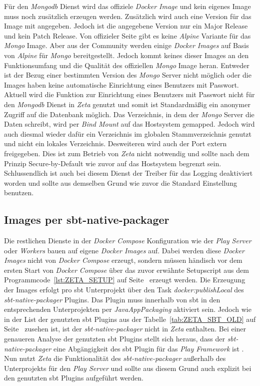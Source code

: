 Für den \textit{Mongodb} Dienst wird das offiziele \textit{Docker Image} und kein eigenes Image muss noch zusätzlich erzeugen werden. Zusätzlich wird auch eine Version für das Image mit angegeben. Jedoch ist die angegebene Version nur ein Major Release und kein Patch Release. Von offizieler Seite gibt es keine \textit{Alpine} Variante für das \textit{Mongo} Image. Aber aus der Community werden einige \textit{Docker Images} auf Basis von \textit{Alpine} für \textit{Mongo} bereitgestellt. Jedoch kommt keines dieser Images an den Funktionsumfang und die Qualität des offiziellen \textit{Mongo} Image heran. Entweder ist der Bezug einer bestimmten Version des \textit{Mongo} Server nicht möglich oder die Images haben keine automatische Einrichtung eines Benutzers mit Passwort. Aktuell wird die Funktion zur Einrichtung eines Benutzers mit Passwort nicht für den \textit{Mongodb} Dienst in \textit{Zeta} genutzt und somit ist Standardmäßig ein anonymer Zugriff auf die Datenbank möglich.  Das Verzeichnis, in dem der \textit{Mongo} Server die Daten schreibt, wird per \textit{Bind Mount} auf das Hostsystem gemapped. Jedoch wird auch diesmal wieder dafür ein Verzeichnis im globalen Stammverzeichnis genutzt und nicht ein lokales Verzeichnis. Desweiteren wird auch der Port extern freigegeben. Dies ist zum Betrieb von \textit{Zeta} nicht notwendig und sollte nach dem Prinzip Secure-by-Default wie zuvor auf das Hostsystem begrenzt sein. Schlussendlich ist auch bei diesem Dienst der Treiber für das Logging deaktiviert worden und sollte aus demselben Grund wie zuvor die Standard Einstellung benutzen.

\subsection{Images per sbt-native-packager}

Die restlichen Dienste in der \textit{Docker Compose} Konfiguration wie der \textit{Play Server} oder \textit{Workers} bauen auf eigene \textit{Docker Images} auf. Dabei werden diese \textit{Docker Images} nicht von \textit{Docker Compose} erzeugt, sondern müssen händisch vor dem ersten Start von \textit{Docker Compose} über das zuvor erwähnte Setupscript aus dem Programmcode~\ref{lst:ZETA_SETUP} auf Seite~\pageref{lst:ZETA_SETUP} erzeugt werden. Die Erzeugung der Images erfolgt pro \ac{sbt} Unterprojekt über den Task \textit{docker:publishLocal} des \textit{sbt-native-packager} Plugins. Das Plugin muss innerhalb von \ac{sbt} in den entsprechenden Unterprojekten per \textit{JavaAppPackaging} aktiviert sein. Jedoch wie in der List der genutzten \ac{sbt} Plugins aus der Tabelle~\ref{tab:ZETA_SBT_OLD} auf Seite~\pageref{tab:ZETA_SBT_OLD} zusehen ist, ist der \textit{sbt-native-packager} nicht in \textit{Zeta} enthalten. Bei einer genaueren Analyse der genutzten \ac{sbt} Plugins stellt sich heraus, dass der \textit{sbt-native-packager} eine Abgängigkeit des \ac{sbt} Plugin für das \textit{Play Framework} ist \cite{play_sbt_plugin_packager}. Nun nutzt \textit{Zeta} die Funktionalität des \textit{sbt-native-packager} außerhalb des Unterprojekts für den \textit{Play Server} und sollte aus diesem Grund auch explizit bei den genutzten \ac{sbt} Plugins aufgeführt werden.

